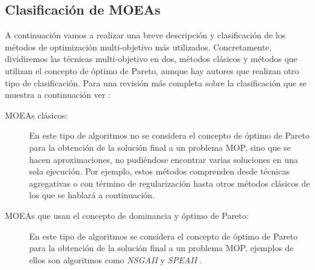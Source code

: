 \subsection{Clasificación de MOEAs}\label{clasificacionMOEAS}
\noindent A continuación vamos a realizar una breve descripción y clasificación de los
métodos de optimización multi-objetivo más utilizados.
Concretamente, dividiremos las técnicas multi-objetivo en dos, métodos clásicos y métodos
que utilizan el concepto de óptimo de Pareto, aunque hay autores que realizan otro tipo de
clasificación. Para una revisión más completa sobre la clasificación que se muestra a
continuación ver \cite{Deb2004,Coello2007}:
\begin{description}
\item [MOEAs clásicos:] En este tipo de algoritmos no se considera el concepto
de óptimo de Pareto para la obtención de la solución final a un problema MOP, sino
que se hacen aproximaciones, no pudiéndose encontrar varias soluciones en una sola
ejecución. Por
ejemplo, estos métodos comprenden desde técnicas agregativas o con término de
regularización hasta otros métodos clásicos de
los que se hablará a continuación.
\item [MOEAs que usan el concepto de dominancia y óptimo de Pareto:] En este tipo de
algoritmos se considera el concepto de óptimo de Pareto para la obtención de la
solución final a un problema MOP, ejemplos de ellos son algoritmos como \textit{NSGAII}
\cite{Deb2002} y \textit{SPEAII} \cite{Zitzler2001}.
 \end{description}

